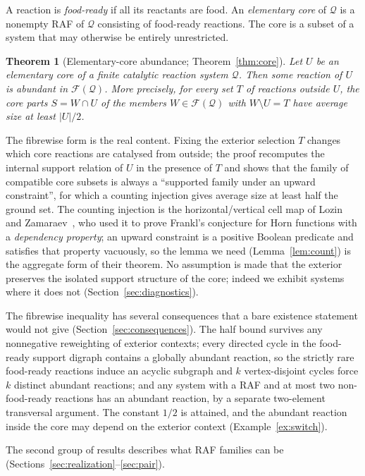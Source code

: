 \documentclass[11pt,a4paper]{article}
\theoremstyle{plain}
\newtheorem{theorem}{Theorem}[section]
\theoremstyle{definition}
\theoremstyle{remark}
\newcommand{\FF}{\mathcal F}
\newcommand{\QQ}{\mathcal Q}
\begin{document}
A reaction is \emph{food-ready} if all its reactants are food. An \emph{elementary core} of
$\QQ$ is a nonempty RAF of $\QQ$ consisting of food-ready reactions. The core is a subset
of a system that may otherwise be entirely unrestricted.

\begin{theorem}[Elementary-core abundance; Theorem~\ref{thm:core}]\label{thm:intro-core}
Let $U$ be an elementary core of a finite catalytic reaction system $\QQ$. Then some
reaction of $U$ is abundant in $\FF(\QQ)$. More precisely, for every set $T$ of reactions
outside $U$, the core parts $S=W\cap U$ of the members $W\in\FF(\QQ)$ with $W\setminus U=T$
have average size at least $|U|/2$.
\end{theorem}

The fibrewise form is the real content. Fixing the exterior selection $T$ changes which
core reactions are catalysed from outside; the proof recomputes the internal support
relation of $U$ in the presence of $T$ and shows that the family of compatible core subsets
is always a ``supported family under an upward constraint'', for which a counting injection
gives average size at least half the ground set. The counting injection is the
horizontal/vertical cell map of Lozin and Zamaraev~\cite{lozin2024union}, who used it to
prove Frankl's conjecture for Horn functions with a \emph{dependency property}; an upward
constraint is a positive Boolean predicate and satisfies that property vacuously, so the
lemma we need (Lemma~\ref{lem:count}) is the aggregate form of their theorem. No assumption is
made that the exterior preserves the isolated support structure of the core; indeed we exhibit
systems where it does not (Section~\ref{sec:diagnostics}).

The fibrewise inequality has several consequences that a bare existence statement would not
give (Section~\ref{sec:consequences}). The half bound survives any nonnegative reweighting of
exterior contexts; every directed cycle in the food-ready support digraph contains a globally
abundant reaction, so the strictly rare food-ready reactions induce an acyclic subgraph and
$k$ vertex-disjoint cycles force $k$ distinct abundant reactions; and any system with a RAF
and at most two non-food-ready reactions has an abundant reaction, by a separate two-element
transversal argument. The constant $1/2$ is attained, and the abundant reaction inside the
core may depend on the exterior context (Example~\ref{ex:switch}).

The second group of results describes what RAF families can be (Sections~\ref{sec:realization}--\ref{sec:pair}).
\end{document}
